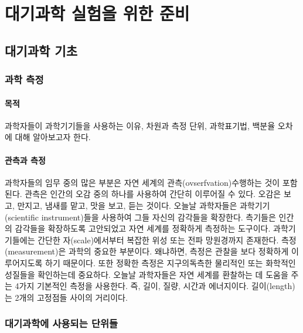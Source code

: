 

\part{대기과학 실험을 위한 준비}



\chapter{대기과학 기초}


\section{과학 측정}

\subsection{목적}

과학자들이 과학기기들을 사용하는 이유, 차원과 측정 단위, 과학표기법, 백분율 오차에 대해 알아보고자 한다.

\subsection{관측과 측정}

과학자들의 임무 중의 많은 부분은 자연 세계의 관측(ovserfvation)\을 수행하는 것이 포함된다. 관측은 인간의 오감 중의 하나를 사용하여 간단히 이루어질 수 있다. 오감은 보고, 만지고, 냄새를 맡고, 맛을 보고, 듣는 것이다. 오늘날 과학자들은 과학기기(scientific instrument)들을 사용하여 그들 자신의 감각들을 확장한다. 측기들은 인간의 감각들을 확장하도록 고안되었고 자연 세계를 정확하게 측정하는 도구이다. 과학기기들에는 간단한 자(scale)에서부터 복잡한 위성 또는 전파 망원경까지 존재한다. 측정(measurement)은 과학의 중요한 부분이다. 왜냐하면, 측정은 관찰을 보다 정확하게 이루어지도록 하기 때문이다.
또한 정확한 측정은 지구의독측한 물리적인 또는 화학적인 성질들을 확인하는데 중요하다. 오늘날 과학자들은 자연 세계를 환찰하는 데 도움을 주는 4가지 기본적인 측정을 사용한다. 즉, 길이, 질량, 시간과 에너지이다. 길이(length)는 2개의 고정점들 사이의 거리이다. 


\section{대기과학에 사용되는 단위들}

